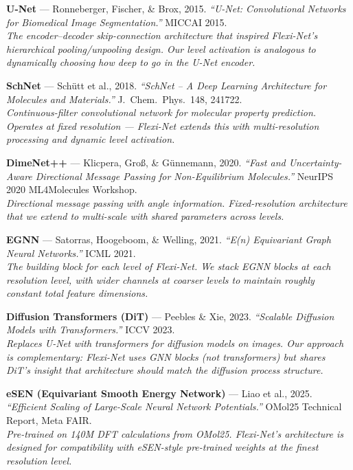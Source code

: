 \documentclass[12pt,a4paper]{article}
\begin{document}
\begin{enumerate}[leftmargin=*, label={[\arabic*]}]

\item \textbf{U-Net} --- Ronneberger, Fischer, \& Brox, 2015.
\textit{``U-Net: Convolutional Networks for Biomedical Image Segmentation.''}
MICCAI 2015.\\
\emph{The encoder--decoder skip-connection architecture that inspired Flexi-Net's hierarchical pooling/unpooling design. Our level activation is analogous to dynamically choosing how deep to go in the U-Net encoder.}

\item \textbf{SchNet} --- Sch\"{u}tt et al., 2018.
\textit{``SchNet -- A Deep Learning Architecture for Molecules and Materials.''}
J.\ Chem.\ Phys.\ 148, 241722.\\
\emph{Continuous-filter convolutional network for molecular property prediction. Operates at fixed resolution --- Flexi-Net extends this with multi-resolution processing and dynamic level activation.}

\item \textbf{DimeNet++} --- Klicpera, Gro\ss, \& G\"{u}nnemann, 2020.
\textit{``Fast and Uncertainty-Aware Directional Message Passing for Non-Equilibrium Molecules.''}
NeurIPS 2020 ML4Molecules Workshop.\\
\emph{Directional message passing with angle information. Fixed-resolution architecture that we extend to multi-scale with shared parameters across levels.}

\item \textbf{EGNN} --- Satorras, Hoogeboom, \& Welling, 2021.
\textit{``E(n) Equivariant Graph Neural Networks.''}
ICML 2021.\\
\emph{The building block for each level of Flexi-Net. We stack EGNN blocks at each resolution level, with wider channels at coarser levels to maintain roughly constant total feature dimensions.}

\item \textbf{Diffusion Transformers (DiT)} --- Peebles \& Xie, 2023.
\textit{``Scalable Diffusion Models with Transformers.''}
ICCV 2023.\\
\emph{Replaces U-Net with transformers for diffusion models on images. Our approach is complementary: Flexi-Net uses GNN blocks (not transformers) but shares DiT's insight that architecture should match the diffusion process structure.}

\item \textbf{eSEN (Equivariant Smooth Energy Network)} --- Liao et al., 2025.
\textit{``Efficient Scaling of Large-Scale Neural Network Potentials.''}
OMol25 Technical Report, Meta FAIR.\\
\emph{Pre-trained on 140M DFT calculations from OMol25. Flexi-Net's architecture is designed for compatibility with eSEN-style pre-trained weights at the finest resolution level.}

\end{enumerate}
\end{document}
